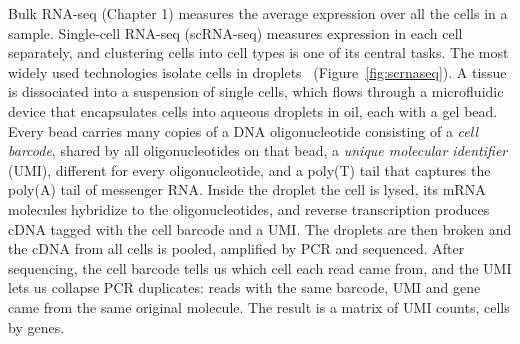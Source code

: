 Bulk RNA-seq (Chapter 1) measures the average expression over all the cells in a sample. Single-cell RNA-seq (scRNA-seq) measures expression in each cell separately, and clustering cells into cell types is one of its central tasks. The most widely used technologies isolate cells in droplets~\citep{macosko2015,klein2015,zheng2017} (Figure~\ref{fig:scrnaseq}). A tissue is dissociated into a suspension of single cells, which flows through a microfluidic device that encapsulates cells into aqueous droplets in oil, each with a gel bead. Every bead carries many copies of a DNA oligonucleotide consisting of a \emph{cell barcode}, shared by all oligonucleotides on that bead, a \emph{unique molecular identifier} (UMI), different for every oligonucleotide, and a poly(T) tail that captures the poly(A) tail of messenger RNA. Inside the droplet the cell is lysed, its mRNA molecules hybridize to the oligonucleotides, and reverse transcription produces cDNA tagged with the cell barcode and a UMI. The droplets are then broken and the cDNA from all cells is pooled, amplified by PCR and sequenced. After sequencing, the cell barcode tells us which cell each read came from, and the UMI lets us collapse PCR duplicates: reads with the same barcode, UMI and gene came from the same original molecule. The result is a matrix of UMI counts, cells by genes.

